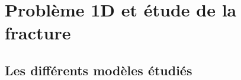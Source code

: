 
\chapter{Problème 1D et étude de la fracture} %

\label{Chapter3} %










\section{Les différents modèles étudiés}











